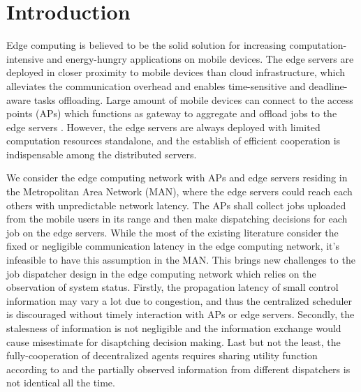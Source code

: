 
\section{Introduction}
Edge computing is believed to be the solid solution for increasing computation-intensive and energy-hungry applications on mobile devices.
The edge servers are deployed in closer proximity to mobile devices than cloud infrastructure, which alleviates the communication overhead and enables {time-sensitive} and {deadline-aware} tasks offloading.
Large amount of mobile devices can connect to the access points (APs) which functions as gateway to aggregate and offload jobs to the edge servers \cite{MEC-SURVEY}.
However, the edge servers are always deployed with limited computation resources standalone, and the establish of efficient cooperation is indispensable among the distributed servers.

We consider the edge computing network with APs and edge servers residing in the Metropolitan Area Network (MAN), where the edge servers could reach each others with unpredictable network latency\cite{MOBIHOC19-ZhouZ,tan-online,IOTJ18-FanQ}.
The APs shall collect jobs uploaded from the mobile users in its range and then make dispatching decisions for each job on the edge servers.
While the most of the existing literature consider the fixed or negligible communication latency in the edge computing network\cite{TOC19-LiuC,JSAC19-AlameddineHA,ACCESS19-ZhengX,tan-online}, it's infeasible to have this assumption in the MAN.
This brings new challenges to the job dispatcher design in the edge computing network which relies on the observation of system status.
Firstly, the propagation latency of small control information may vary a lot due to congestion, and thus the centralized scheduler is discouraged without timely interaction with APs or edge servers.
Secondly, the stalesness of information is not negligible and the information exchange would cause misestimate for disaptching decision making.
Last but not the least, the fully-cooperation of decentralized agents requires sharing utility function according to \cite{IJCAI03-NairR} and the partially observed information from different dispatchers is not identical all the time.

